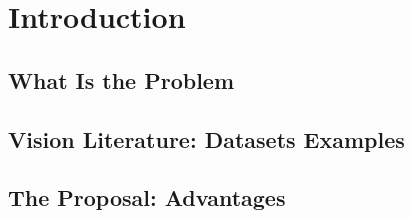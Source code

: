 \section{Introduction}
\label{sec:intro}
\subsection{What Is the Problem}
\subsection{Vision Literature: Datasets Examples}
\subsection{The Proposal: Advantages}